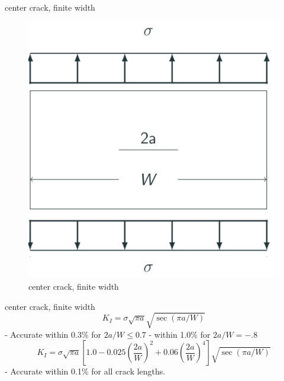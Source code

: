 \documentclass[
  letterpaper,
  ignorenonframetext,
  aspectratio=43,
  handout,
  12pt]{beamer}
\let\Oldincludegraphics\includegraphics
\renewcommand{\includegraphics}[2][]{\Oldincludegraphics[width=\textwidth,height=0.7\textheight,keepaspectratio]{#2}}
\begin{document}
\begin{frame}{center crack, finite width}
\protect\hypertarget{center-crack-finite-width}{}
\begin{figure}
\centering
\includegraphics{../images/center-finite.svg}
\caption{center crack, finite width}
\end{figure}
\end{frame}

\begin{frame}{center crack, finite width}
\protect\hypertarget{center-crack-finite-width-1}{}
\[K_I = \sigma \sqrt{\pi a} \sqrt{\sec (\pi a/W)}\] - Accurate within
0.3\% for \(2a/W \le 0.7\) - within 1.0\% for \(2a/W = -.8\)
\[K_I = \sigma \sqrt{\pi a} \left[1.0 - 0.025\left(\frac{2a}{W}\right)^2 + 0.06\left(\frac{2a}{W}\right)^4\right]\sqrt{\sec (\pi a/W)}\]
- Accurate within 0.1\% for all crack lengths.
\end{frame}
\end{document}
